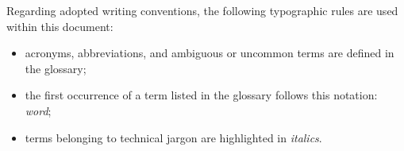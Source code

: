 Regarding adopted writing conventions, the following typographic rules are used
within this document:
\begin{itemize}
      \item acronyms, abbreviations, and ambiguous or uncommon terms are
      defined in the glossary;
      \item the first occurrence of a term listed in the glossary follows this
      notation: \textit{word}\glox\gloxspacing;
      \item terms belonging to technical jargon are highlighted in
      \textit{italics}.
\end{itemize}